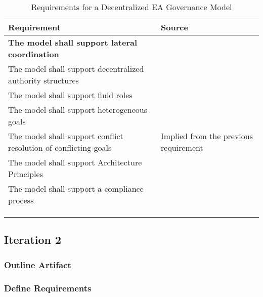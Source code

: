 \begin{table}
\caption{Requirements for a Decentralized EA Governance Model}
\label{table:requirements}
\begin{tabular}{ | p{} | p{} |}
%
\hline
%
\textbf{Requirement} & 
\textbf{Source}  \\
%
\hline
%
\textbf{The model shall support lateral coordination} & \\
%
%
The model shall support decentralized authority structures & 
\cite{Weill2004,pearlson2009,robbins1997,Camarinha-Matos2005} \\
%
The model shall support fluid roles &
\cite{valveHandbook} \\
%
%
The model shall support heterogeneous goals & 
\cite{Camarinha-Matos2005} \\
%
%
The model shall support conflict resolution of conflicting goals  & 
Implied from the previous requirement \\
%
\hline
%
The model shall support Architecture Principles & 
 \\
%
\hline
%
The model shall support a compliance process & 
 \\
%
\hline
%
 & 
 \\
%
\hline
%
 & 
 \\
%
\hline
%
 & 
 \\
%
\hline
%
\end{tabular}
\end{table}



\subsection{Iteration 2}

\subsubsection*{Outline Artifact}


\subsubsection*{Define Requirements}


